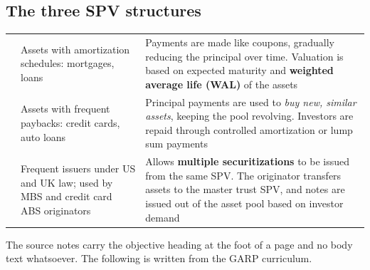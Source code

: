 \subsection*{The three SPV structures}

\begin{center}
\footnotesize
\begin{tabular}{L{2.6cm} L{5.4cm} L{6.5cm}}
\toprule
{} &  &  \\
\midrule
{} & Assets with amortization schedules: mortgages, loans &
  Payments are made like coupons, gradually reducing the principal over time.
  Valuation is based on expected maturity and \textbf{weighted average life (WAL)}
  of the assets \\
 & Assets with frequent paybacks: credit cards, auto loans &
  Principal payments are used to \emph{buy new, similar assets}, keeping the pool
  revolving. Investors are repaid through controlled amortization or lump sum
  payments \\
 & Frequent issuers under US and UK law; used by MBS and
  credit card ABS originators &
  Allows \textbf{multiple securitizations} to be issued from the same SPV. The
  originator transfers assets to the master trust SPV, and notes are issued out of
  the asset pool based on investor demand \\
\bottomrule
\end{tabular}
\end{center}


\gapbadge

{\footnotesize\color{FRMGrey}The source notes carry the objective heading at the
foot of a page and no body text whatsoever. The following is written from the GARP
curriculum.}

